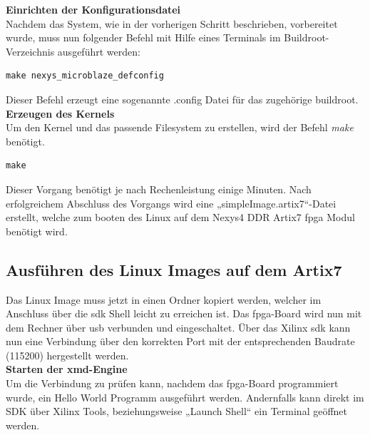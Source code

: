 \textbf{Einrichten der Konfigurationsdatei}\\

Nachdem das System, wie in der vorherigen Schritt beschrieben,
vorbereitet wurde, muss nun folgender Befehl mit Hilfe eines Terminals im Buildroot-Verzeichnis ausgeführt werden:\\

\begin{lstlisting}[caption={Generierung der \emph{defconf}-Datei},label={code:mbdefconf}]
  make nexys_microblaze_defconfig
 \end{lstlisting}


Dieser Befehl erzeugt eine sogenannte .config Datei für das zugehörige buildroot.\\

\textbf{Erzeugen des Kernels}\\

Um den Kernel und das passende Filesystem zu erstellen, wird der Befehl \emph{make} benötigt.\\

\begin{lstlisting}[caption={Erstellung des Kernels},label={code:mbkernel}]
  make
   \end{lstlisting}

Dieser Vorgang benötigt je nach Rechenleistung einige Minuten.
Nach erfolgreichem Abschluss des Vorgangs wird eine „simpleImage.artix7“-Datei erstellt,
welche zum booten des Linux auf dem Nexys4 DDR Artix7 \ac{fpga} Modul benötigt wird.

\subsection{Ausführen des Linux Images auf dem Artix7}\label{kap:mcausführenlinux}



Das Linux Image muss jetzt in einen Ordner kopiert werden, welcher im Anschluss über
die \ac{sdk} Shell leicht zu erreichen ist. Das \ac{fpga}-Board wird nun mit dem Rechner über \ac{usb} verbunden und eingeschaltet.
 Über das Xilinx \ac{sdk} kann nun eine Verbindung über den korrekten Port mit der entsprechenden Baudrate (115200)
 hergestellt werden.\\

\textbf{Starten der \ac{xmd}-Engine}\\

Um die Verbindung zu prüfen kann, nachdem das \ac{fpga}-Board programmiert wurde, ein Hello World Programm ausgeführt werden. Andernfalls kann direkt im SDK über Xilinx Tools, beziehungsweise  „Launch Shell“ ein Terminal geöffnet werden.\\

